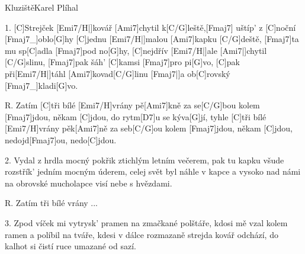 \begin{song}{Kluziště}{Karel Plíhal}

\begin{xverse}{1. }
[C]Strejček [Emi7/H|]{kovář} [Ami7]chytil k[C/G]leště,[Fmaj7] uštíp' z [C]noční [Fmaj7_]{oblo}[G]{hy}
[C]jednu [Emi7/H|]{malou} [Ami7]kapku [C/G]deště, [Fmaj7]ta mu sp[C]adla [Fmaj7]pod no[G]{hy,}
[C]nejdřív [Emi7/H|]{ale} [Ami7|]{chytil} [C/G]slinu, [Fmaj7]pak šáh' [C]kamsi [Fmaj7]pro pi[G]{vo,}
[C]pak při[Emi7/H|]{táhl} [Ami7]kovad[C/G]linu [Fmaj7|]{}a ob[C]rovský [Fmaj7_]{kladi}[G]{vo.}
\end{xverse}

\begin{xverse}{R. }
Zatím [C]tři bílé [Emi7/H]vrány pě[Ami7]kně za se[C/G]bou
kolem [Fmaj7]jdou, někam [C]jdou, do rytm[D7]u se kýva[G]jí,
tyhle [C]tři bílé [Emi7/H]{vrány} pěk[Ami7]ně za seb[C/G]ou
kolem [Fmaj7]jdou, někam [C]jdou, nedojd[Fmaj7]ou, nedo[C]jdou.
\end{xverse}

\begin{xverse}{2. }
Vydal z hrdla mocný pokřik ztichlým letním večerem,
pak tu kapku všude rozstřík' jedním mocným úderem,
celej svět byl náhle v kapce a vysoko nad námi
na obrovské mucholapce visí nebe s hvězdami.
\end{xverse}

\begin{xverse}{R. }
Zatím tři bílé vrány ...
\end{xverse}

\begin{xverse}{3. }
Zpod víček mi vytrysk' pramen na zmačkané polštáře,
kdosi mě vzal kolem ramen a políbil na tváře,
kdesi v dálce rozmazaně strejda kovář odchází,
do kalhot si čistí ruce umazané od sazí.
\end{xverse}
\end{song}
\chords{ \chordAmiSeven \chordFmajSeven }

